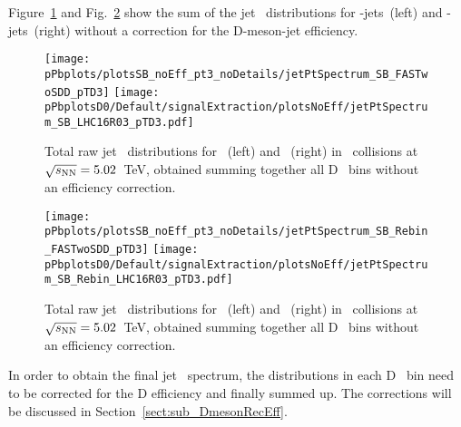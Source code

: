 Figure~\ref{fig:eq_pPb_signBkgJet_tot} and Fig.~\ref{fig:eq_pPb_signBkgJet_tot_reb} show the sum of the jet \pt\ distributions for \Dstar-jets\ (left) and \Dzero-jets\ (right) without a correction for the D-meson-jet efficiency.


\begin{figure}[bth]
\centering
\texttt{[image: pPbplots/plotsSB\_noEff\_pt3\_noDetails/jetPtSpectrum\_SB\_FASTwoSDD\_pTD3]}
\texttt{[image: pPbplotsD0/Default/signalExtraction/plotsNoEff/jetPtSpectrum\_SB\_LHC16R03\_pTD3.pdf]}
\caption{Total raw jet \pt\ distributions for \Dstar\ (left) and \Dzero\ (right) in \pPb\ collisions at $\sqrt{s_{\rm NN}}=5.02$~TeV, obtained summing together all D \pt\ bins without an efficiency correction.}
\label{fig:eq_pPb_signBkgJet_tot}
\end{figure}

\begin{figure}[bth]
\centering
\texttt{[image: pPbplots/plotsSB\_noEff\_pt3\_noDetails/jetPtSpectrum\_SB\_Rebin\_FASTwoSDD\_pTD3]}
\texttt{[image: pPbplotsD0/Default/signalExtraction/plotsNoEff/jetPtSpectrum\_SB\_Rebin\_LHC16R03\_pTD3.pdf]}
\caption{Total raw jet \pt\ distributions for \Dstar\ (left) and \Dzero\ (right) in \pPb\ collisions at $\sqrt{s_{\rm NN}}=5.02$~TeV, obtained summing together all D \pt\ bins without an efficiency correction.}
\label{fig:eq_pPb_signBkgJet_tot_reb}
\end{figure}

%
%

In order to obtain the final jet \pt\ spectrum, the distributions in each D \pt\ bin need to be corrected for the D efficiency and finally summed up.
The corrections will be discussed in Section~\ref{sect:sub_DmesonRecEff}. 
